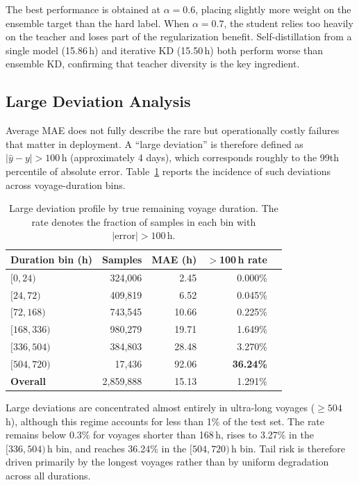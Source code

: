 \documentclass[sigconf,anonymous]{acmart}%
\begin{document}
The best performance is obtained at $\alpha = 0.6$, placing slightly more weight on the ensemble target than the hard label. When $\alpha = 0.7$, the student relies too heavily on the teacher and loses part of the regularization benefit. Self-distillation from a single model (15.86\,h) and iterative KD (15.50\,h) both perform worse than ensemble KD, confirming that teacher diversity is the key ingredient.

\subsection{Large Deviation Analysis}
\label{sec:large_dev}

Average MAE does not fully describe the rare but operationally costly failures that matter in deployment. A ``large deviation'' is therefore defined as $|\hat{y} - y| > 100$\,h (approximately 4 days), which corresponds roughly to the 99th percentile of absolute error. Table~\ref{tab:large_dev_profile} reports the incidence of such deviations across voyage-duration bins.

\begin{table}[t]
    \centering
    \caption{Large deviation profile by true remaining voyage duration. The rate denotes the fraction of samples in each bin with $|\text{error}| > 100$\,h.}
    \label{tab:large_dev_profile}
    \begin{tabular}{lrrrr}
        \toprule
        \textbf{Duration bin (h)} & \textbf{Samples} & \textbf{MAE (h)} & \textbf{$>$100\,h rate} \\
        \midrule
        $[0, 24)$     & 324,006  & 2.45  & 0.000\% \\
        $[24, 72)$    & 409,819  & 6.52  & 0.045\% \\
        $[72, 168)$   & 743,545  & 10.66 & 0.225\% \\
        $[168, 336)$  & 980,279  & 19.71 & 1.649\% \\
        $[336, 504)$  & 384,803  & 28.48 & 3.270\% \\
        $[504, 720)$  & 17,436   & 92.06 & \textbf{36.24\%} \\
        \midrule
        \textbf{Overall}  & 2,859,888 & 15.13 & 1.291\% \\
        \bottomrule
    \end{tabular}
\end{table}

Large deviations are concentrated almost entirely in ultra-long voyages ($\geq 504$\,h), although this regime accounts for less than 1\% of the test set. The rate remains below 0.3\% for voyages shorter than 168\,h, rises to 3.27\% in the $[336, 504)$\,h bin, and reaches 36.24\% in the $[504, 720)$\,h bin. Tail risk is therefore driven primarily by the longest voyages rather than by uniform degradation across all durations.
\end{document}
